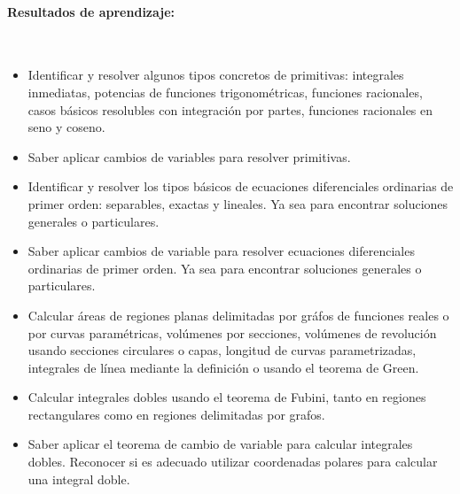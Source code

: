 \paragraph{Resultados de aprendizaje:}\ \par\vspace{-1em}
\begin{itemize}
\item
Identificar y resolver algunos tipos concretos de primitivas: integrales inmediatas, potencias de funciones trigonométricas, funciones racionales,
casos básicos resolubles con integración por partes, funciones racionales en seno y coseno.

\item
Saber aplicar cambios de variables para resolver primitivas.

\item
Identificar y resolver los tipos básicos de ecuaciones diferenciales ordinarias de primer orden: separables, exactas y lineales.
Ya sea para encontrar soluciones generales o particulares.

\item
Saber aplicar cambios de variable para resolver ecuaciones diferenciales ordinarias de primer orden.
Ya sea para encontrar soluciones generales o particulares.


\item
Calcular áreas de regiones planas delimitadas por gráfos de funciones reales o por curvas paramétricas, volúmenes por secciones, volúmenes de revolución usando secciones circulares o capas,
longitud de curvas parametrizadas, integrales de línea mediante la definición o usando el teorema de Green.

\item
Calcular integrales dobles usando el teorema de Fubini, tanto en regiones rectangulares como en regiones delimitadas por grafos.

\item
Saber aplicar el teorema de cambio de variable para calcular integrales dobles. 
Reconocer si es adecuado utilizar coordenadas polares para calcular una integral doble.


\end{itemize}


